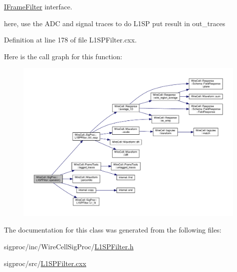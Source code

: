 \hyperlink{class_wire_cell_1_1_i_frame_filter}{I\+Frame\+Filter} interface. 

here, use the A\+DC and signal traces to do L1\+SP put result in out\+\_\+traces 

Definition at line 178 of file L1\+S\+P\+Filter.\+cxx.

Here is the call graph for this function\+:
\nopagebreak
\begin{figure}[H]
\begin{center}
\leavevmode
\includegraphics[width=350pt]{class_wire_cell_1_1_sig_proc_1_1_l1_s_p_filter_ac58397721b0a7b485d46ac63522ebe87_cgraph}
\end{center}
\end{figure}


The documentation for this class was generated from the following files\+:\begin{DoxyCompactItemize}
\item 
sigproc/inc/\+Wire\+Cell\+Sig\+Proc/\hyperlink{_l1_s_p_filter_8h}{L1\+S\+P\+Filter.\+h}\item 
sigproc/src/\hyperlink{_l1_s_p_filter_8cxx}{L1\+S\+P\+Filter.\+cxx}\end{DoxyCompactItemize}
